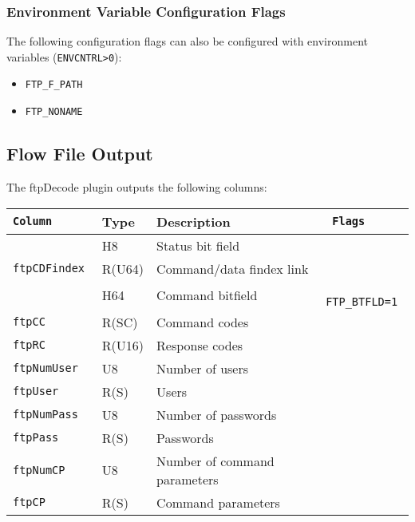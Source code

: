 \documentclass[documentation]{subfiles}
\begin{document}
\subsubsection{Environment Variable Configuration Flags}
The following configuration flags can also be configured with environment variables ({\tt ENVCNTRL>0}):
\begin{itemize}
    \item {\tt FTP\_F\_PATH}
    \item {\tt FTP\_NONAME}
\end{itemize}

\subsection{Flow File Output}
The ftpDecode plugin outputs the following columns:
\begin{longtable}{>{\tt}lll>{\tt\small}l}
    \toprule
    {\bf Column} & {\bf Type} & {\bf Description} & {\bf Flags}\\
    \midrule\endhead%
    \nameref{ftpStat} & H8     & Status bit field             & \\
    ftpCDFindex       & R(U64) & Command/data findex link     & \\
    \nameref{ftpCBF}  & H64    & Command bitfield             & FTP\_BTFLD=1\\
    ftpCC             & R(SC)  & Command codes                & \\
    ftpRC             & R(U16) & Response codes               & \\
    ftpNumUser        & U8     & Number of users              & \\
    ftpUser           & R(S)   & Users                        & \\
    ftpNumPass        & U8     & Number of passwords          & \\
    ftpPass           & R(S)   & Passwords                    & \\
    ftpNumCP          & U8     & Number of command parameters & \\
    ftpCP             & R(S)   & Command parameters           & \\
    \bottomrule
\end{longtable}
\end{document}
